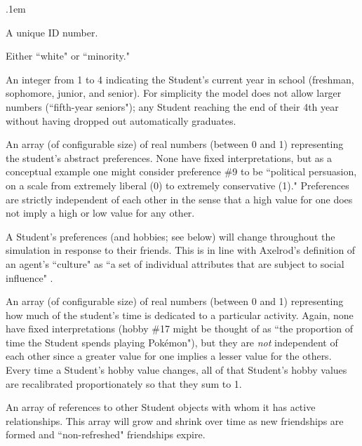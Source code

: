 \begin{description}
\itemsep.1em
\item[ID] A unique ID number.

\item[Race] Either ``white" or ``minority."

\item[Year] An integer from 1 to 4 indicating the Student's current year
in school (freshman, sophomore, junior, and senior). For simplicity the model
does not allow larger numbers (``fifth-year seniors"); any Student reaching
the end of their 4th year without having dropped out automatically graduates.

\item[Preferences] An array (of configurable size) of real numbers
(between 0 and 1) representing the student's abstract preferences. None have
fixed interpretations, but as a conceptual example one might consider
preference \#9 to be ``political persuasion, on a scale from extremely liberal
(0) to extremely conservative (1)." Preferences are strictly independent of
each other in the sense that a high value for one does not imply a high or low
value for any other.

A Student's preferences (and hobbies; see below) will change throughout the
simulation in response to their friends. This is in line with Axelrod's
definition of an agent's ``culture" as ``a set of individual attributes that
are subject to social influence" \citeyear{axelrod_dissemination_1997}.

\item[Hobbies] An array (of configurable size) of real numbers (between 0 and
1) representing how much of the student's time is dedicated to a particular
activity. Again, none have fixed interpretations (hobby \#17 might be thought
of as ``the proportion of time the Student spends playing Pok\'emon"), but
they are \textit{not} independent of each other since a greater value for one
implies a lesser value for the others. Every time a Student's hobby value
changes, all of that Student's hobby values are recalibrated proportionately
so that they sum to 1.

\item[Friends] An array of references to other Student objects with whom
it has active relationships. This array will grow and shrink over time as new
friendships are formed and ``non-refreshed" friendships expire.

\end{description}

